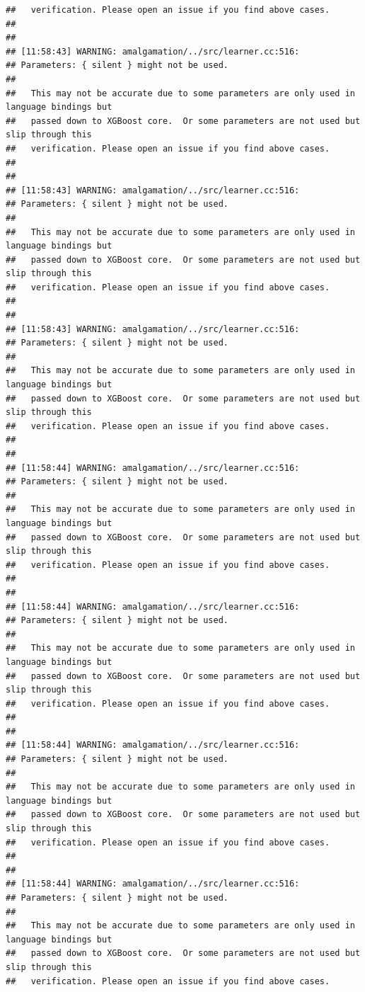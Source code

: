 \documentclass[AMS,STIX2COL]{WileyNJD-v2}\usepackage[]{graphicx}\usepackage[]{color}
\makeatletter
\newenvironment{kframe}{%
 \def\at@end@of@kframe{}%
 \ifinner\ifhmode%
  \def\at@end@of@kframe{\end{minipage}}%
  \begin{minipage}{\columnwidth}%
 \fi\fi%
 \def\FrameCommand##1{\hskip\@totalleftmargin \hskip-\fboxsep
 \colorbox{shadecolor}{##1}\hskip-\fboxsep
     \hskip-\linewidth \hskip-\@totalleftmargin \hskip\columnwidth}%
 \MakeFramed {\advance\hsize-\width
   \@totalleftmargin\z@ \linewidth\hsize
   \@setminipage}}%
 {\par\unskip\endMakeFramed%
 \at@end@of@kframe}
\newenvironment{knitrout}{}{} %
\makeatother
\begin{document}
\begin{knitrout}
\begin{kframe}
\begin{verbatim}
##   verification. Please open an issue if you find above cases.
## 
## 
## [11:58:43] WARNING: amalgamation/../src/learner.cc:516: 
## Parameters: { silent } might not be used.
## 
##   This may not be accurate due to some parameters are only used in language bindings but
##   passed down to XGBoost core.  Or some parameters are not used but slip through this
##   verification. Please open an issue if you find above cases.
## 
## 
## [11:58:43] WARNING: amalgamation/../src/learner.cc:516: 
## Parameters: { silent } might not be used.
## 
##   This may not be accurate due to some parameters are only used in language bindings but
##   passed down to XGBoost core.  Or some parameters are not used but slip through this
##   verification. Please open an issue if you find above cases.
## 
## 
## [11:58:43] WARNING: amalgamation/../src/learner.cc:516: 
## Parameters: { silent } might not be used.
## 
##   This may not be accurate due to some parameters are only used in language bindings but
##   passed down to XGBoost core.  Or some parameters are not used but slip through this
##   verification. Please open an issue if you find above cases.
## 
## 
## [11:58:44] WARNING: amalgamation/../src/learner.cc:516: 
## Parameters: { silent } might not be used.
## 
##   This may not be accurate due to some parameters are only used in language bindings but
##   passed down to XGBoost core.  Or some parameters are not used but slip through this
##   verification. Please open an issue if you find above cases.
## 
## 
## [11:58:44] WARNING: amalgamation/../src/learner.cc:516: 
## Parameters: { silent } might not be used.
## 
##   This may not be accurate due to some parameters are only used in language bindings but
##   passed down to XGBoost core.  Or some parameters are not used but slip through this
##   verification. Please open an issue if you find above cases.
## 
## 
## [11:58:44] WARNING: amalgamation/../src/learner.cc:516: 
## Parameters: { silent } might not be used.
## 
##   This may not be accurate due to some parameters are only used in language bindings but
##   passed down to XGBoost core.  Or some parameters are not used but slip through this
##   verification. Please open an issue if you find above cases.
## 
## 
## [11:58:44] WARNING: amalgamation/../src/learner.cc:516: 
## Parameters: { silent } might not be used.
## 
##   This may not be accurate due to some parameters are only used in language bindings but
##   passed down to XGBoost core.  Or some parameters are not used but slip through this
##   verification. Please open an issue if you find above cases.

\end{verbatim}
\end{kframe}
\end{knitrout}
\end{document}
